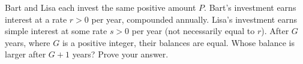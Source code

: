 Bart and Lisa each invest the same positive amount $P$. Bart's investment earns interest at a rate $r>0$ per year, compounded annually. Lisa's investment earns simple interest at some rate $s>0$ per year (not necessarily equal to $r$). After $G$ years, where $G$ is a positive integer, their balances are equal. Whose balance is larger after $G+1$ years? Prove your answer.
